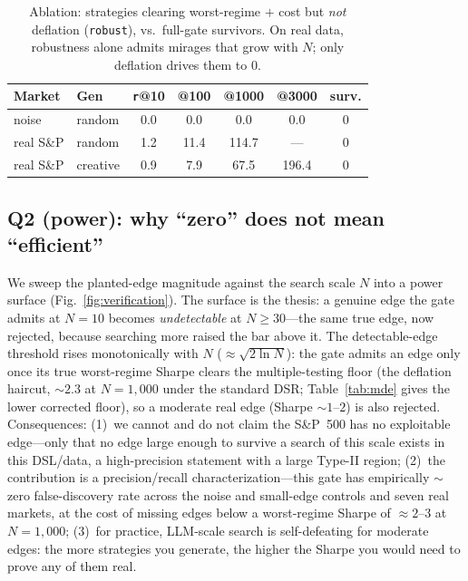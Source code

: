 \documentclass[sigconf,review,anonymous]{acmart}
\begin{document}
\begin{table}[t]
\caption{Ablation: strategies clearing worst-regime $+$ cost but \emph{not} deflation (\texttt{robust}), vs.\ full-gate survivors. On real data, robustness alone admits mirages that grow with $N$; only deflation drives them to 0.}
\label{tab:ablation}
\small
\begin{tabular}{@{}llccccc@{}}
\toprule
Market & Gen & \texttt{r}@10 & @100 & @1000 & @3000 & surv. \\
\midrule
noise & random & 0.0 & 0.0 & 0.0 & 0.0 & 0 \\
real S\&P & random & 1.2 & 11.4 & 114.7 & --- & 0 \\
real S\&P & creative & 0.9 & 7.9 & 67.5 & 196.4 & 0 \\
\bottomrule
\end{tabular}
\end{table}

\subsection{Q2 (power): why ``zero'' does not mean ``efficient''}
\label{sec:power}
We sweep the planted-edge magnitude against the search scale $N$ into a power surface (Fig.~\ref{fig:verification}). The surface is the thesis: a genuine edge the gate admits at $N{=}10$ becomes \emph{undetectable} at $N\ge30$---the same true edge, now rejected, because searching more raised the bar above it. The detectable-edge threshold rises monotonically with $N$ (${\approx}\sqrt{2\ln N}$): the gate admits an edge only once its true worst-regime Sharpe clears the multiple-testing floor (the deflation haircut, ${\sim}2.3$ at $N{=}1{,}000$ under the standard DSR; Table~\ref{tab:mde} gives the lower corrected floor), so a moderate real edge (Sharpe ${\sim}1$--$2$) is also rejected. Consequences: (1)~we cannot and do not claim the S\&P~500 has no exploitable edge---only that no edge large enough to survive a search of this scale exists in this DSL/data, a high-precision statement with a large Type-II region; (2)~the contribution is a precision/recall characterization---this gate has empirically ${\sim}$zero false-discovery rate across the noise and small-edge controls and seven real markets, at the cost of missing edges below a worst-regime Sharpe of ${\approx}2$--$3$ at $N{=}1{,}000$; (3)~for practice, LLM-scale search is self-defeating for moderate edges: the more strategies you generate, the higher the Sharpe you would need to prove any of them real.
\end{document}

